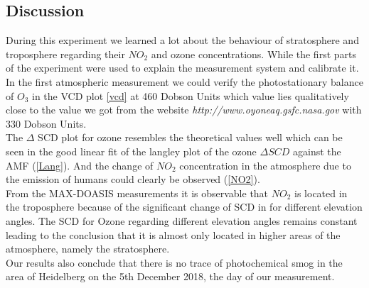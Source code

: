 \documentclass[12pt, english]{scrartcl} %
\begin{document}
\begin{multicols}{2}
\section{Discussion}
During this experiment we learned a lot about the behaviour of stratosphere and troposphere regarding their $NO_2$ and ozone concentrations.
While the first parts of the experiment were used to explain the measurement system and calibrate it.\\
In the first atmospheric measurement we could verify the photostationary balance of $O_3$ in the VCD plot \ref{vcd} at 460 Dobson Units which value lies qualitatively close to the value we got from the website \textit{http://www.oyoneaq.gsfc.nasa.gov} with 330 Dobson Units.\\
The $\Delta$ SCD plot for ozone resembles the theoretical values well which can be seen in the good linear fit of the langley plot of the ozone $\Delta SCD$ against the AMF (\ref{Lang}).  And the change of $NO_2$ concentration in the atmosphere due to the emission of humans could clearly be observed (\ref{NO2}).\\
From the MAX-DOASIS measurements it is observable that $NO_2$ is located in the troposphere because of the significant change of SCD in for different elevation angles. The SCD for Ozone regarding different elevation angles remains constant leading to the conclusion that it is almost only located in higher areas of the atmosphere, namely the stratosphere.\\
Our results also conclude that there is no trace of photochemical smog in the area of Heidelberg on the 5th December 2018, the day of our measurement.
\end{multicols}
\end{document}
